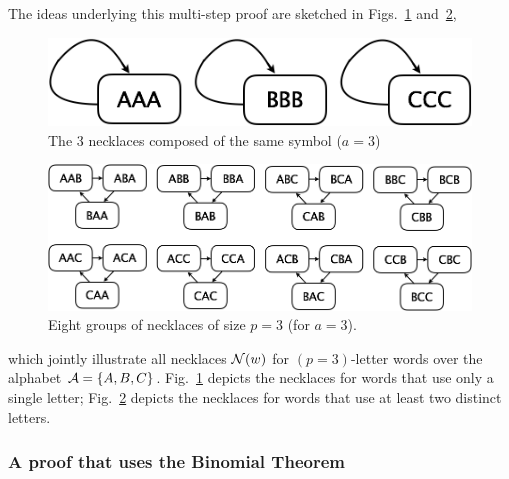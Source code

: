 The ideas underlying this multi-step proof are sketched in Figs.~\ref{fig:necklace3} and~\ref{fig:necklace24},
\begin{figure}[htb]
\begin{center}
        \includegraphics[scale=0.3]{FiguresArithmetic/Necklace3.png}
        \caption{The 3 necklaces composed of the same symbol ($a=3$)}
        \label{fig:necklace3}
\end{center}
\end{figure}
\begin{figure}[htb]
\begin{center}
        \includegraphics[scale=0.25]{FiguresArithmetic/Necklace24.png}
        \caption{Eight groups of necklaces of size $p=3$ (for $a=3$).}
        \label{fig:necklace24}
\end{center}
\end{figure}
which jointly illustrate all necklaces $\mbox{$\cal N$}(w)$ for $(p=3)$-letter words over the alphabet $\mbox{$\cal A$} = \{ A,B,C \}$.  Fig.~\ref{fig:necklace3} depicts the necklaces for words that use only a single letter; Fig.~\ref{fig:necklace24} depicts the necklaces for words that use at least two distinct letters.

\subsubsection{A proof that uses the Binomial Theorem}
\label{sec:FTL-via-BinomialTheorem}

